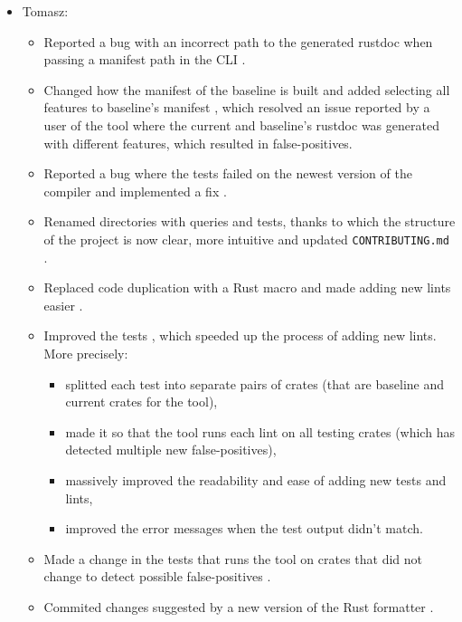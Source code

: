 \documentclass[licencjacka,en]{pracamgr}
\begin{document}
\begin{itemize}
	\item Tomasz:
		\begin{itemize}
			\item Reported a bug with an incorrect path to the generated rustdoc when passing
				a manifest path in the CLI \cite{issue_wrong_path_manifest_path}.
			\item Changed how the manifest of the baseline is built and added
				selecting all features to baseline's manifest \cite{pr_changed_how_manifest_baseline_built},
				which resolved an issue reported by a user of the tool
				\cite{issue_baseline_rustdoc_from_registry_default_features}
				where the current and baseline's rustdoc was generated with different features,
				which resulted in false-positives.
			\item Reported a bug where the tests failed on the newest version
				of the compiler \cite{issue_tests_fail_on_nightly}
				and implemented a fix \cite{pr_tests_fail_on_nightly}.
			\item Renamed directories with queries and tests, thanks to which the
				structure of the project is now clear, more intuitive
				\cite{pr_renamed_directories} \cite{pr_renamed_directories_2}
				and updated \texttt{CONTRIBUTING.md} \cite{pr_renamed_directories_3}.
			\item Replaced code duplication with a Rust macro and made adding new
				lints easier \cite{pr_one_macro}.
			\item Improved the tests \cite{pr_split_each_test},
				which speeded up the process of adding new lints.
				More precisely:
				\begin{itemize}
					\item splitted each test into separate pairs of crates
						(that are baseline and current crates for the tool),
					\item made it so that the tool runs each lint on all testing crates
						(which has detected multiple new false-positives),
					\item massively improved the readability and ease of adding new tests and lints,
					\item improved the error messages when the test output didn't match.
				\end{itemize}
			\item Made a change in the tests that runs the tool on crates that did not change
				to detect possible false-positives \cite{pr_run_lints_nonchanged_crates}.
			\item Commited changes suggested by a new version of the Rust formatter \cite{pr_clippy_lint}.

\end{itemize}
\end{itemize}
\end{document}
